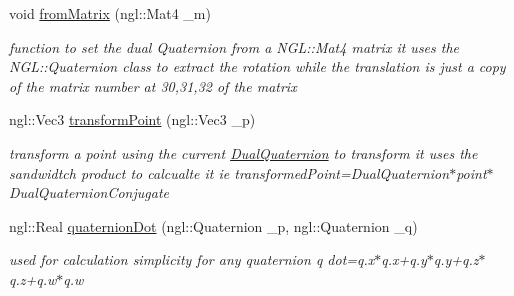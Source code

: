 \begin{DoxyCompactItemize}
void \hyperlink{class_dual_quaternion_a47e44768493e8bc9a0392a16c4be875c}{from\-Matrix} (ngl\-::\-Mat4 \-\_\-m)
\begin{DoxyCompactList}\small\item\em function to set the dual Quaternion from a N\-G\-L\-::\-Mat4 matrix it uses the N\-G\-L\-::\-Quaternion class to extract the rotation while the translation is just a copy of the matrix number at 30,31,32 of the matrix \end{DoxyCompactList}\item 
ngl\-::\-Vec3 \hyperlink{class_dual_quaternion_ae2133762f1c26ed218dd86a6398f85c2}{transform\-Point} (ngl\-::\-Vec3 \-\_\-p)
\begin{DoxyCompactList}\small\item\em transform a point using the current \hyperlink{class_dual_quaternion}{Dual\-Quaternion} to transform it uses the sandwidtch product to calcualte it ie transformed\-Point=Dual\-Quaternion$\ast$point$\ast$\-Dual\-Quaternion\-Conjugate \end{DoxyCompactList}\item 
ngl\-::\-Real \hyperlink{class_dual_quaternion_a6038ccbe49ab17a097cd52384e57cbf8}{quaternion\-Dot} (ngl\-::\-Quaternion \-\_\-p, ngl\-::\-Quaternion \-\_\-q)
\begin{DoxyCompactList}\small\item\em used for calculation simplicity for any quaternion q dot=q.\-x$\ast$q.x+q.y$\ast$q.y+q.z$\ast$q.z+q.w$\ast$q.w \end{DoxyCompactList}\end{DoxyCompactItemize}
